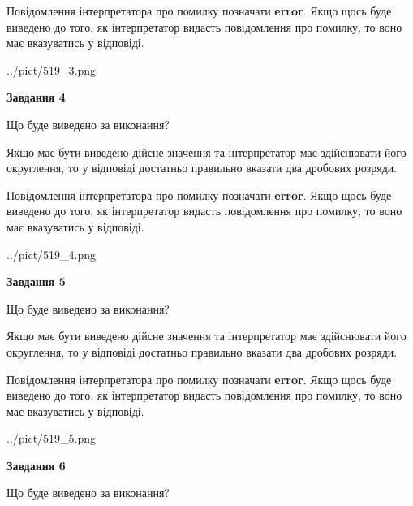 \documentclass[12pt, ukrainian]{article}
\begin{document}
{\begin {Large}
Повідомлення інтерпретатора про помилку позначати \textbf{error}.
Якщо щось буде виведено до того, як інтерпретатор видасть повідомлення про помилку, 
то воно має вказуватись у відповіді. \par

\begin{center}
	{../pict/519_3.png}
\end{center}
\newpage

{\begin {center}\textbf{Завдання 4}\end {center}}\par
Що буде виведено за виконання? \par

Якщо має бути виведено дійсне значення та інтерпретатор має здійснювати його округлення, 
то у відповіді достатньо правильно вказати два дробових розряди.

Повідомлення інтерпретатора про помилку позначати \textbf{error}.
Якщо щось буде виведено до того, як інтерпретатор видасть повідомлення про помилку, 
то воно має вказуватись у відповіді. \par

\begin{center}
	{../pict/519_4.png}
\end{center}
\newpage

{\begin {center}\textbf{Завдання 5}\end {center}}\par
Що буде виведено за виконання? \par

Якщо має бути виведено дійсне значення та інтерпретатор має здійснювати його округлення, 
то у відповіді достатньо правильно вказати два дробових розряди.

Повідомлення інтерпретатора про помилку позначати \textbf{error}.
Якщо щось буде виведено до того, як інтерпретатор видасть повідомлення про помилку, 
то воно має вказуватись у відповіді. \par

\begin{center}
	{../pict/519_5.png}
\end{center}
\newpage

{\begin {center}\textbf{Завдання 6}\end {center}}\par
Що буде виведено за виконання? \par


\end{Large}}
\end{document}

